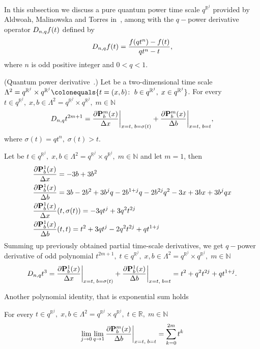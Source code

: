 In this subsection we discuss a pure quantum power time scale $q^{\mathbb{R}^j}$ provided by Aldwoah, Malinowska
and Torres in~\cite{aldwoah2011power}, among with the $q-$power derivative operator $D_{n,q} f(t)$ defined by
\[
    D_{n,q} f(t) = \frac{f(qt^n) - f(t)}{qt^n - t},
\]
where $n$ is odd positive integer and $0 < q < 1$.
\begin{cor}
(Quantum power derivative~\cite{aldwoah2011power}.)
    Let be a two-dimensional time scale
    $\Lambda^2 = q^{\mathbb{R}^j} \times q^{\mathbb{R}^j}
    \colonequals \{t=(x,b) \colon \; b \in q^{\mathbb{R}^j}, \; x \in q^{\mathbb{R}^j} \}$.
    For every $t\in q^{\mathbb{R}^j}, \; x,b\in\Lambda^2 = q^{\mathbb{R}^j} \times q^{\mathbb{R}^j}, \; m\in\mathbb{N}$
    \[
        D_{n,q} t^{2m+1}
        = \frac{\partial {\mathbf{P}}\sp{m} \sb{b}(x)}{\Delta x} \bigg |_{x = t, \; b = \sigma(t)}
        + \frac{\partial {\mathbf{P}}\sp{m} \sb{b}(x)}{\Delta b} \bigg |_{x = t, \; b = t},
    \]
    where $\sigma(t) = qt^n, \; \sigma(t) > t$.
\end{cor}
\begin{examp}
    Let be $t\in q^{\mathbb{R}^j}, \; x,b\in\Lambda^2 = q^{\mathbb{R}^j} \times q^{\mathbb{R}^j}, \; m\in\mathbb{N}$
    and let $m=1$, then
    \begin{align*}
        &\frac{\partial {\mathbf{P}}\sp{1} \sb{b}(x)}{\Delta x} = -3 b + 3 b^2 \\
        &\frac{\partial {\mathbf{P}}\sp{1} \sb{b}(x)}{\Delta b} = 3 b - 2 b^2 + 3 b^j q - 2 b^{1 + j} q - 2 b^{2 j} q^2 - 3 x + 3 b x + 3 b^j q x \\
        &\frac{\partial {\mathbf{P}}\sp{1} \sb{b}(x)}{\Delta x}(t, \sigma(t)) = -3 q t^j + 3 q^2 t^{2 j} \\
        &\frac{\partial {\mathbf{P}}\sp{1} \sb{b}(x)}{\Delta b}(t, t) = t^2 + 3 q t^j - 2 q^2 t^{2 j} + q t^{1 + j}
    \end{align*}
    Summing up previously obtained partial time-scale derivatives, we get $q-$power derivative of odd polynomial
    $t^{2m+1}, \; t\in q^{\mathbb{R}^j}, \; x,b\in\Lambda^2 = q^{\mathbb{R}^j} \times q^{\mathbb{R}^j}, \; m\in\mathbb{N}$
    \[
        D_{n,q} t^{3}
        = \frac{\partial {\mathbf{P}}\sp{1} \sb{b}(x)}{\Delta x} \bigg |_{x = t, \; b = \sigma(t)}
        + \frac{\partial {\mathbf{P}}\sp{1} \sb{b}(x)}{\Delta b} \bigg |_{x = t, \; b = t}
        = t^2 + q^2 t^{2 j} + q t^{1 + j}.
    \]
\end{examp}

Another polynomial identity, that is exponential sum holds
\begin{cor}
    For every $t\in q^{\mathbb{R}^j}, \; x,b\in\Lambda^2 = q^{\mathbb{R}^j} \times q^{\mathbb{R}^j}, \; t\in\mathbb{R}, \; m\in\mathbb{N}$
    \[
        \lim \limits_{j \to 0} \lim \limits_{q \to 1} \frac{\partial {\mathbf{P}}\sp{m} \sb{b}(x)}{\Delta b} \bigg |_{x = t, \; b = t}
        = \sum_{k=0}^{2m} t^k
    \]
\end{cor}

